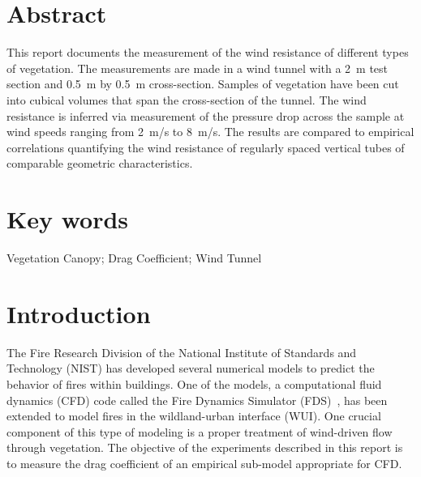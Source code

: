 \documentclass[12pt]{article}
\begin{document}
\pagestyle{plain}

\section*{Abstract}

This report documents the measurement of the wind resistance of different types of vegetation. The measurements are made in a wind tunnel with a 2~m test section and 0.5~m by 0.5~m cross-section. Samples of vegetation have been cut into cubical volumes that span the cross-section of the tunnel. The wind resistance is inferred via measurement of the pressure drop across the sample at wind speeds ranging from 2~m/s to 8~m/s. The results are compared to empirical correlations quantifying the wind resistance of regularly spaced vertical tubes of comparable geometric characteristics.

\section*{Key words}

Vegetation Canopy; Drag Coefficient; Wind Tunnel

\cleardoublepage

\begin{center}
	\tableofcontents
	\listoftables
	\listoffigures
\end{center}

\cleardoublepage

\pagestyle{plain}


\section{Introduction}
\label{sec:intro}

The Fire Research Division of the National Institute of Standards and Technology (NIST) has developed several numerical models to predict the behavior of fires within buildings. One of the models, a computational fluid dynamics (CFD) code called the Fire Dynamics Simulator (FDS)~\cite{FDS_Tech_Guide}, has been extended to model fires in the wildland-urban interface (WUI). One crucial component of this type of modeling is a proper treatment of wind-driven flow through vegetation. The objective of the experiments described in this report is to measure the drag coefficient of an empirical sub-model appropriate for CFD.
\end{document}
